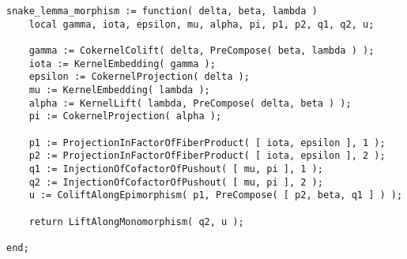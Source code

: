\begin{small}
\begin{Verbatim}[frame=single]
snake_lemma_morphism := function( delta, beta, lambda )
    local gamma, iota, epsilon, mu, alpha, pi, p1, p2, q1, q2, u;
    
    gamma := CokernelColift( delta, PreCompose( beta, lambda ) );
    iota := KernelEmbedding( gamma );
    epsilon := CokernelProjection( delta );
    mu := KernelEmbedding( lambda );
    alpha := KernelLift( lambda, PreCompose( delta, beta ) );
    pi := CokernelProjection( alpha );
    
    p1 := ProjectionInFactorOfFiberProduct( [ iota, epsilon ], 1 );
    p2 := ProjectionInFactorOfFiberProduct( [ iota, epsilon ], 2 );
    q1 := InjectionOfCofactorOfPushout( [ mu, pi ], 1 );
    q2 := InjectionOfCofactorOfPushout( [ mu, pi ], 2 );
    u := ColiftAlongEpimorphism( p1, PreCompose( [ p2, beta, q1 ] ) );

    return LiftAlongMonomorphism( q2, u );
    
end;
\end{Verbatim}
\end{small}
